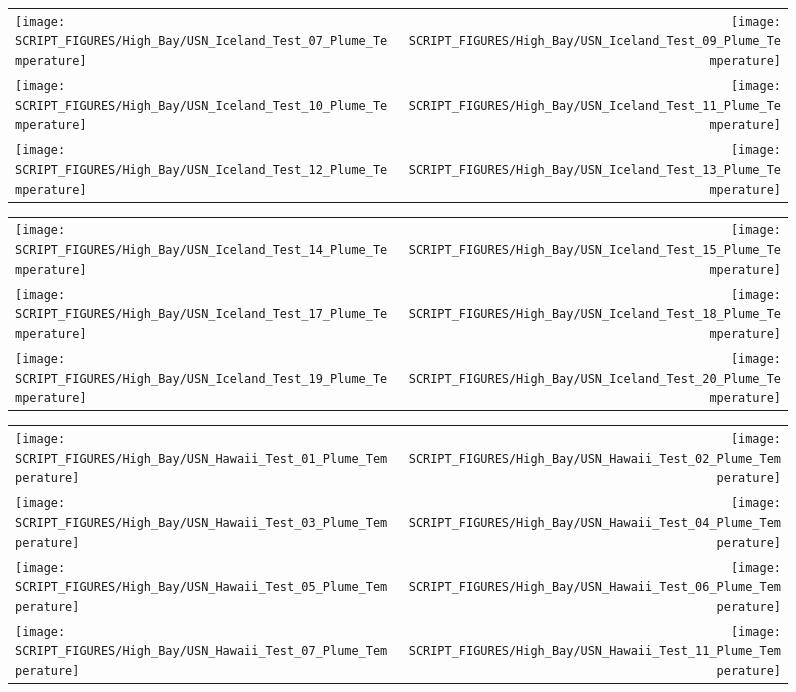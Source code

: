\begin{figure}[p]
\begin{tabular*}{\textwidth}{l@{\extracolsep{\fill}}r}
\texttt{[image: SCRIPT\_FIGURES/High\_Bay/USN\_Iceland\_Test\_07\_Plume\_Temperature]} &
\texttt{[image: SCRIPT\_FIGURES/High\_Bay/USN\_Iceland\_Test\_09\_Plume\_Temperature]} \\
\texttt{[image: SCRIPT\_FIGURES/High\_Bay/USN\_Iceland\_Test\_10\_Plume\_Temperature]} &
\texttt{[image: SCRIPT\_FIGURES/High\_Bay/USN\_Iceland\_Test\_11\_Plume\_Temperature]} \\
\texttt{[image: SCRIPT\_FIGURES/High\_Bay/USN\_Iceland\_Test\_12\_Plume\_Temperature]} &
\texttt{[image: SCRIPT\_FIGURES/High\_Bay/USN\_Iceland\_Test\_13\_Plume\_Temperature]} \\
\end{tabular*}
\label{USN_Plume_Iceland_2}
\end{figure}

\begin{figure}[p]
\begin{tabular*}{\textwidth}{l@{\extracolsep{\fill}}r}
\texttt{[image: SCRIPT\_FIGURES/High\_Bay/USN\_Iceland\_Test\_14\_Plume\_Temperature]} &
\texttt{[image: SCRIPT\_FIGURES/High\_Bay/USN\_Iceland\_Test\_15\_Plume\_Temperature]} \\
\texttt{[image: SCRIPT\_FIGURES/High\_Bay/USN\_Iceland\_Test\_17\_Plume\_Temperature]} &
\texttt{[image: SCRIPT\_FIGURES/High\_Bay/USN\_Iceland\_Test\_18\_Plume\_Temperature]} \\
\texttt{[image: SCRIPT\_FIGURES/High\_Bay/USN\_Iceland\_Test\_19\_Plume\_Temperature]} &
\texttt{[image: SCRIPT\_FIGURES/High\_Bay/USN\_Iceland\_Test\_20\_Plume\_Temperature]} \\
\end{tabular*}
\label{USN_Plume_Iceland_3}
\end{figure}

\begin{figure}[p]
\begin{tabular*}{\textwidth}{l@{\extracolsep{\fill}}r}
\texttt{[image: SCRIPT\_FIGURES/High\_Bay/USN\_Hawaii\_Test\_01\_Plume\_Temperature]} &
\texttt{[image: SCRIPT\_FIGURES/High\_Bay/USN\_Hawaii\_Test\_02\_Plume\_Temperature]} \\
\texttt{[image: SCRIPT\_FIGURES/High\_Bay/USN\_Hawaii\_Test\_03\_Plume\_Temperature]} &
\texttt{[image: SCRIPT\_FIGURES/High\_Bay/USN\_Hawaii\_Test\_04\_Plume\_Temperature]} \\
\texttt{[image: SCRIPT\_FIGURES/High\_Bay/USN\_Hawaii\_Test\_05\_Plume\_Temperature]} &
\texttt{[image: SCRIPT\_FIGURES/High\_Bay/USN\_Hawaii\_Test\_06\_Plume\_Temperature]} \\
\texttt{[image: SCRIPT\_FIGURES/High\_Bay/USN\_Hawaii\_Test\_07\_Plume\_Temperature]} &
\texttt{[image: SCRIPT\_FIGURES/High\_Bay/USN\_Hawaii\_Test\_11\_Plume\_Temperature]}
\end{tabular*}
\label{USN_Plume_Hawaii}
\end{figure}

